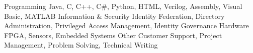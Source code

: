 \begin{cvskills}
	\cvskill
		{Programming}
		{Java, C, C++, C\#, Python, HTML, Verilog, Assembly, Visual Basic, MATLAB}
	\cvskill
		{Information \& Security}
		{Identity Federation, Directory Administration, Privileged Access Management, Identity Governance}
	\cvskill
		{Hardware}
		{FPGA, Sensors, Embedded Systems}
	\cvskill
		{Other}
		{Customer Support, Project Management, Problem Solving, Technical Writing}
\end{cvskills}
